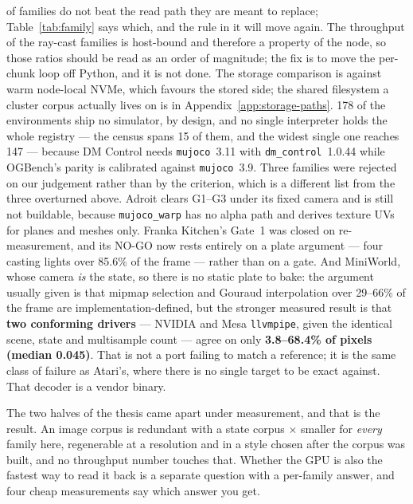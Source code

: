 \documentclass{article}
\begin{document}
\seNfamBelow{} of \seNfamRated{} families do not beat the read path they are
meant to replace; Table~\ref{tab:family} says which, and the rule in it will
move again. The throughput of the ray-cast families is host-bound and therefore
a property of the node, so those ratios should be read as an order of
magnitude; the fix is to move the per-chunk loop off Python, and it is not
done. The
storage comparison is against warm node-local NVMe, which favours the stored
side; the shared filesystem a cluster corpus actually lives on is in
Appendix~\ref{app:storage-paths}. 178 of the \seNenvs{} environments ship no
simulator, by design, and no single interpreter holds the whole registry --- the
census spans 15 of them, and the widest single one reaches 147 --- because DM
Control needs \texttt{mujoco}~3.11 with \texttt{dm\_control}~1.0.44 while
OGBench's parity is calibrated against \texttt{mujoco}~3.9. Three families were rejected on our
judgement rather than by the criterion, which is a different list from the three
overturned above. Adroit clears G1--G3 under its fixed camera
and is still not buildable, because \texttt{mujoco\_warp} has no alpha path and
derives texture UVs for planes and meshes only. Franka Kitchen's Gate~1 was
closed on re-measurement, and its NO-GO now rests entirely on a plate argument
--- four casting lights over 85.6\% of the frame --- rather than on a gate.
And MiniWorld, whose camera \emph{is} the state, so there is no static plate to
bake: the argument usually given is that mipmap selection and Gouraud
interpolation over 29--66\% of the frame are implementation-defined, but the
stronger measured result is that \textbf{two conforming drivers} --- NVIDIA and
Mesa \texttt{llvmpipe}, given the identical scene, state and multisample count
--- agree on only \textbf{3.8--68.4\% of pixels (median 0.045)}. That is not a
port failing to match a reference; it is the same class of failure as Atari's,
where there is no single target to be exact against. That decoder is a vendor
binary.

The two halves of the thesis came apart under measurement, and that is the
result. An image corpus is redundant with a state corpus
\seStorageRatio$\times$ smaller for \emph{every} family here, regenerable at a
resolution and in a style chosen after the corpus was built, and no throughput
number touches that. Whether the GPU is also the fastest way to read it back is
a separate question with a per-family answer, and four cheap measurements say
which answer you get.
\end{document}
